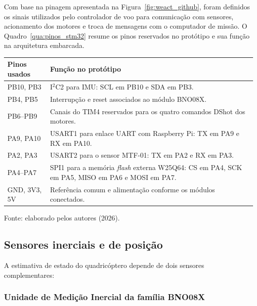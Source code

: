 Com base na pinagem apresentada na Figura~\ref{fig:weact_github}, foram definidos os sinais utilizados pelo controlador de voo para comunicação com sensores, acionamento dos motores e troca de mensagens com o computador de missão. O Quadro~\ref{qua:pinos_stm32} resume os pinos reservados no protótipo e sua função na arquitetura embarcada.

\begin{quadro}[H]
  \centering
  \caption{Pinos da placa STM32F4x1 utilizados no protótipo.}
  \label{qua:pinos_stm32}
  \small
  \renewcommand{\arraystretch}{1.3}
  \begin{tabular}{|>{\centering\arraybackslash}p{2.4cm}|>{\raggedright\arraybackslash}p{10.5cm}|}
  \hline
  \textbf{Pinos usados} & \textbf{Função no protótipo} \\
  \hline
  PB10, PB3 & I$^2$C2 para IMU: SCL em PB10 e SDA em PB3. \\
  \hline
  PB4, PB5 & Interrupção e reset associados ao módulo BNO08X. \\
  \hline
  PB6--PB9 & Canais do TIM4 reservados para os quatro comandos DShot dos motores. \\
  \hline
  PA9, PA10 & USART1 para enlace UART com Raspberry Pi: TX em PA9 e RX em PA10. \\
  \hline
  PA2, PA3 & USART2 para o sensor MTF-01: TX em PA2 e RX em PA3. \\
  \hline
  PA4--PA7 & SPI1 para a memória \textit{flash} externa W25Q64: CS em PA4, SCK em PA5, MISO em PA6 e MOSI em PA7. \\
  \hline
  GND, 3V3, 5V & Referência comum e alimentação conforme os módulos conectados. \\
  \hline
  \end{tabular}
  \par\vspace{0.2cm}
  \footnotesize Fonte: elaborado pelos autores (2026).
\end{quadro}

\subsection{Sensores inerciais e de posição}\label{subsec:sensores}

A estimativa de estado do quadricóptero depende de dois sensores complementares:

\subsubsection{Unidade de Medição Inercial da família BNO08X}\label{subsubsec:bno08x}

